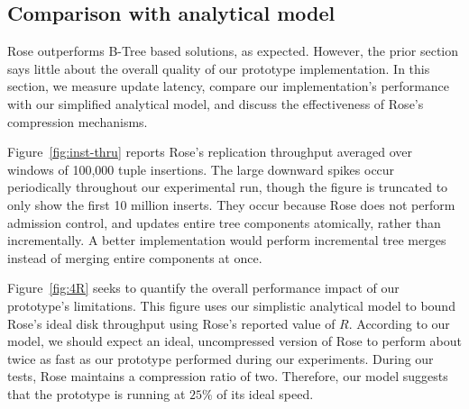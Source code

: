 \documentclass{vldb}
\newcommand{\rows}{Rose\xspace}
\newcommand{\rowss}{Rose's\xspace}
\begin{document}

\subsection{Comparison with analytical model}

\rows outperforms B-Tree based solutions, as expected.  However, the
prior section says little about the overall quality of our prototype
implementation.  In this section, we measure update latency, compare
our implementation's performance with our simplified analytical model,
and discuss the effectiveness of \rowss compression mechanisms.

Figure~\ref{fig:inst-thru} reports \rowss replication throughput
averaged over windows of 100,000 tuple insertions.  The large downward
spikes occur periodically throughout our experimental run, though the
figure is truncated to only show the first 10 million inserts.  They
occur because \rows does not perform admission control, and updates
entire tree components atomically, rather than incrementally.
A better implementation would perform
incremental tree merges instead of merging entire components at once.

Figure~\ref{fig:4R} seeks to quantify the overall performance
impact of our prototype's
limitations.  This figure uses our simplistic analytical model
to bound \rowss ideal disk throughput using \rowss
reported value of $R$.  According to our
model, we should expect an ideal, uncompressed version of \rows to
perform about twice as fast as our prototype performed during our experiments.  During our tests, \rows
maintains a compression ratio of two.  Therefore, our model suggests
that the prototype is running at $25\%$ of its ideal speed.
\end{document}
